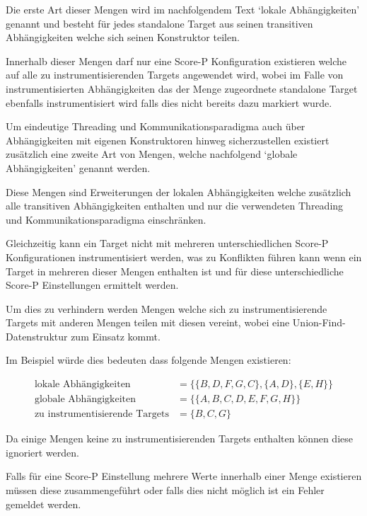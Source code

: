\documentclass[german,proseminar,hyperref,utf8]{zihpub}
\begin{document}
    Die erste Art dieser Mengen wird im nachfolgendem Text `lokale Abhängigkeiten' genannt und
    besteht für jedes standalone Target aus seinen transitiven Abhängigkeiten welche sich
    seinen Konstruktor teilen.

    Innerhalb dieser Mengen darf nur eine Score-P Konfiguration existieren welche auf alle zu
    instrumentisierenden Targets angewendet wird, wobei im Falle von instrumentisierten Abhängigkeiten
    das der Menge zugeordnete standalone Target ebenfalls instrumentisiert wird falls dies nicht
    bereits dazu markiert wurde.

    Um eindeutige Threading und Kommunikationsparadigma auch über Abhängigkeiten mit eigenen
    Konstruktoren hinweg sicherzustellen existiert zusätzlich eine zweite Art von Mengen, welche
    nachfolgend `globale Abhängigkeiten' genannt werden.

    Diese Mengen sind Erweiterungen der lokalen Abhängigkeiten welche zusätzlich alle transitiven
    Abhängigkeiten enthalten und nur die verwendeten Threading und Kommunikationsparadigma einschränken.

    Gleichzeitig kann ein Target nicht mit mehreren unterschiedlichen Score-P Konfigurationen
    instrumentisiert werden, was zu Konflikten führen kann wenn ein Target in mehreren dieser
    Mengen enthalten ist und für diese unterschiedliche Score-P Einstellungen ermittelt werden.

    Um dies zu verhindern werden Mengen welche sich zu instrumentisierende Targets mit anderen
    Mengen teilen mit diesen vereint, wobei eine Union-Find-Datenstruktur zum Einsatz kommt.
    
    Im Beispiel würde dies bedeuten dass folgende Mengen existieren:

    \begin{align}
        \text{lokale Abhängigkeiten} &= \{ \{ B, D, F, G, C \}, \{ A, D \}, \{ E, H \} \} \\
        \text{globale Abhängigkeiten} &= \{ \{ A, B, C, D, E, F, G, H \} \} \\
        \text{zu instrumentisierende Targets} &= \{ B, C, G \}
    \end{align}

    Da einige Mengen keine zu instrumentisierenden Targets enthalten können diese ignoriert werden.

    Falls für eine Score-P Einstellung mehrere Werte innerhalb einer Menge existieren müssen diese
    zusammengeführt oder falls dies nicht möglich ist ein Fehler gemeldet werden.
\end{document}

